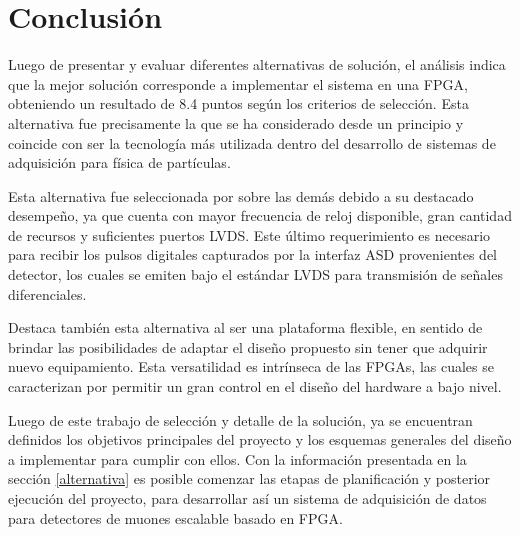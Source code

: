 \section{Conclusión}
\par Luego de presentar y evaluar diferentes alternativas de solución, el análisis indica que la mejor solución corresponde a implementar el sistema en una FPGA, obteniendo un resultado de 8.4 puntos según los criterios de selección. Esta alternativa fue precisamente la que se ha considerado desde un principio y coincide con ser la tecnología más utilizada dentro del desarrollo de sistemas de adquisición para física de partículas\cite{Basiladze2017Methods1}\cite{Basiladze2017Methods2}.
\par Esta alternativa fue seleccionada por sobre las demás debido a su destacado desempeño, ya que cuenta con mayor frecuencia de reloj disponible, gran cantidad de recursos y suficientes puertos LVDS. Este último requerimiento es necesario para recibir los pulsos digitales capturados por la interfaz ASD provenientes del detector, los cuales se emiten bajo el estándar LVDS para transmisión de señales diferenciales.
\par Destaca también esta alternativa al ser una plataforma flexible, en sentido de brindar las posibilidades de adaptar el diseño propuesto sin tener que adquirir nuevo equipamiento. Esta versatilidad es intrínseca de las FPGAs, las cuales se caracterizan por permitir un gran control en el diseño del hardware a bajo nivel.
\par Luego de este trabajo de selección y detalle de la solución, ya se encuentran definidos los objetivos principales del proyecto y los esquemas generales del diseño a implementar para cumplir con ellos. Con la información presentada en la sección \ref{alternativa} es posible comenzar las etapas de planificación y posterior ejecución del proyecto, para desarrollar así un sistema de adquisición de datos para detectores de muones escalable basado en FPGA.
